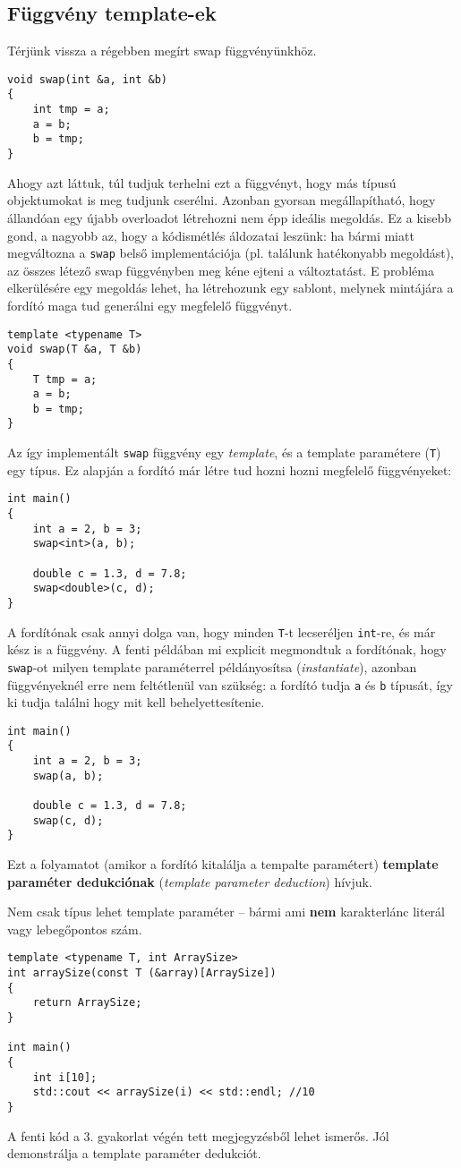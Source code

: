\documentclass[a4paper,11.5pt,table]{article}
\begin{document}
	\subsection{Függvény template-ek}
	Térjünk vissza a régebben megírt swap függvényünkhöz.
	\begin{lstlisting}
void swap(int &a, int &b)
{
	int tmp = a;
	a = b;
	b = tmp;
}
	\end{lstlisting}
	Ahogy azt láttuk, túl tudjuk terhelni ezt a függvényt, hogy más típusú objektumokat is meg tudjunk cserélni.
	Azonban gyorsan megállapítható, hogy állandóan egy újabb overloadot létrehozni nem épp ideális megoldás. Ez a kisebb gond, a nagyobb az, hogy a kódismétlés áldozatai leszünk: ha bármi miatt megváltozna a \texttt{swap} belső implementációja (pl. találunk hatékonyabb megoldást), az összes létező swap függvényben meg kéne ejteni a változtatást. E probléma elkerülésére egy megoldás lehet, ha létrehozunk egy sablont, melynek mintájára a fordító maga tud generálni egy megfelelő függvényt.
	\begin{lstlisting}
template <typename T>
void swap(T &a, T &b)
{
	T tmp = a;
	a = b;
	b = tmp;
}
	\end{lstlisting}
	Az így implementált \texttt{swap} függvény egy \textit{template}, és a template paramétere (\texttt{T}) egy típus. Ez alapján a fordító már létre tud hozni hozni megfelelő függvényeket:
	\begin{lstlisting}
int main()
{
	int a = 2, b = 3;
	swap<int>(a, b);
	
	double c = 1.3, d = 7.8;
	swap<double>(c, d);
}
	\end{lstlisting}
	A fordítónak csak annyi dolga van, hogy minden \texttt{T}-t lecseréljen \texttt{int}-re, és már kész is a függvény. A fenti példában mi explicit megmondtuk a fordítónak, hogy \texttt{swap}-ot milyen template paraméterrel {példányosítsa} (\textit{instantiate}), azonban függvényeknél erre nem feltétlenül van szükség: a fordító tudja \texttt{a} és \texttt{b} típusát, így ki tudja találni hogy mit kell behelyettesítenie.
	\begin{lstlisting}
int main()
{
	int a = 2, b = 3;
	swap(a, b);
	
	double c = 1.3, d = 7.8;
	swap(c, d);
}
	\end{lstlisting}
	Ezt a folyamatot (amikor a fordító kitalálja a tempalte paramétert) \textbf{template paraméter dedukciónak} (\textit{template parameter deduction}) hívjuk.
	
	\medskip
	Nem csak típus lehet template paraméter -- bármi ami \textbf{nem} karakterlánc literál vagy lebegőpontos szám.
	\begin{lstlisting}
template <typename T, int ArraySize>
int arraySize(const T (&array)[ArraySize])
{
	return ArraySize;
}

int main()
{
	int i[10];
	std::cout << arraySize(i) << std::endl; //10
}
	\end{lstlisting}
	A fenti kód a 3. gyakorlat végén tett megjegyzésből lehet ismerős. Jól demonstrálja a template paraméter dedukciót.
\end{document}
